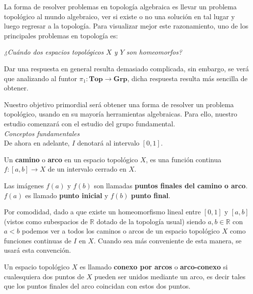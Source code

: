 \documentclass{article}
\theoremstyle{largebreak}
\newcommand\subtitle[1]{\textit{\large #1}\\}
\newcommand\cf[3]{\ensuremath{#1:#2\rightarrow#3}}
\begin{document}
    La forma de resolver problemas en topología algebraica es llevar un problema topológico al mundo algebraico, ver si existe o no una solución en tal lugar y luego regresar a la topología. Para visualizar mejor este razonamiento, uno de los principales problemas en topología es:

    \begin{center}
        \textit{¿Cuándo dos espacios topológicos $X$ y $Y$ son homeomorfos?}
    \end{center}

    Dar una respuesta en general resulta demasiado complicada, sin embargo, se verá que analizando al funtor $\cf{\pi_1}{\textbf{Top}}{\textbf{Grp}}$, dicha respuesta resulta más sencilla de obtener.

    Nuestro objetivo primordial será obtener una forma de resolver un problema topológico, usando en su mayoría herramientas algebraicas. Para ello, nuestro estudio comenzará con el estudio del grupo fundamental.\\

    \subtitle{Conceptos fundamentales}

    De ahora en adelante, $I$ denotará al intervalo $[0,1]$.

    \begin{mydef}
        Un \textbf{camino} o \textbf{arco} en un espacio topológico $X$, es una función continua $\cf{f}{[a,b]}{X}$ de un intervalo cerrado en $X$.

        Las imágenes $f(a)$ y $f(b)$ son llamadas \textbf{puntos finales del camino o arco}. $f(a)$ es llamado \textbf{punto inicial} y $f(b)$ \textbf{punto final}.
    \end{mydef}

    \begin{obs}
        Por comodidad, dado a que existe un homeomorfismo lineal entre $[0,1]$ y $[a,b]$ (vistos como subespacios de $\mathbb{R}$ dotado de la topología usual) siendo $a,b\in\mathbb{R}$ con $a<b$ podemos ver a todos los caminos o arcos de un espacio topológico $X$ como funciones continuas de $I$ en $X$. Cuando sea más conveniente de esta manera, se usará esta convención.
    \end{obs}

    \begin{mydef}
        Un espacio topológico $X$ es llamado \textbf{conexo por arcos} o \textbf{arco-conexo} si cualesquiera dos puntos de $X$ pueden ser unidos mediante un arco, es decir tales que los puntos finales del arco coincidan con estos dos puntos.
    \end{mydef}
\end{document}
